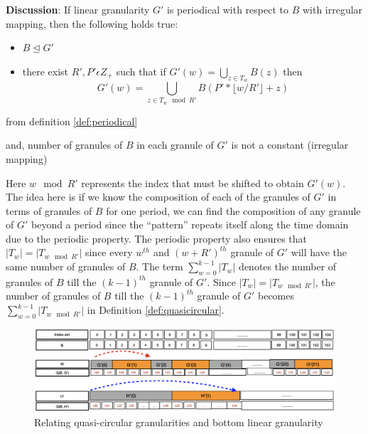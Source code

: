 \documentclass[12pt]{article}
\providecommand{\tightlist}{%
  \setlength{\itemsep}{0pt}\setlength{\parskip}{0pt}}
\begin{document}
\textbf{Discussion}: If linear granularity \(G'\) is periodical with respect to \(B\) with irregular mapping, then the following holds true:

\begin{itemize}
\tightlist
\item
  \(B \trianglelefteq G'\)
\item
  there exist \(R', P' \epsilon Z_+\) such that if \(G'(w) = \bigcup_{z \in T_w}B(z)\) then \[G'(w) = \bigcup_{z \in T_w \mod R'}B(P'*\lfloor w/R' \rfloor + z)\]
\end{itemize}

from definition \ref{def:periodical}

and, number of granules of \(B\) in each granule of \(G'\) is not a constant (irregular mapping)

Here \(w \mod R'\) represents the index that must be shifted to obtain \(G'(w)\). The idea here is if we know the composition of each of the granules of \(G'\) in terms of granules of \(B\) for one period, we can find the composition of any granule of \(G'\) beyond a period since the ``pattern'' repeats itself along the time domain due to the periodic property. The periodic property also ensures that \(\vert T_w \vert = \vert T_{w\mod R'} \vert\) since every \(w^{th}\) and \((w+R')^{th}\) granule of \(G'\) will have the same number of granules of \(B\). The term \(\sum_{w=0}^{k-1}\vert T_{w}\vert\) denotes the number of granules of \(B\) till the \((k-1)^{th}\) granule of \(G'\). Since \(\vert T_w \vert = \vert T_{w\mod R'} \vert\), the number of granules of \(B\) till the \((k-1)^{th}\) granule of \(G'\) becomes \(\sum_{w=0}^{k-1}\vert T_{w \mod R'}\vert\) in Definition \autoref{def:quasicircular}.

\begin{figure}

{\centering \includegraphics[width=1\linewidth]{Figs/quasi-circular-example} 

}

\caption{Relating quasi-circular granularities and bottom linear granularity }\label{fig:quasi-circular-example}
\end{figure}
\end{document}
